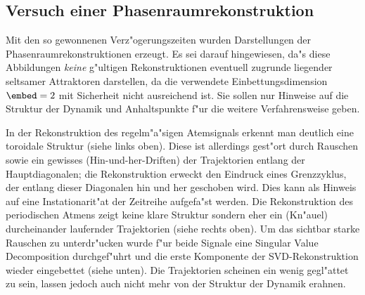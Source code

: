 \subsection{Versuch einer Phasenraumrekonstruktion}
Mit den so gewonnenen Verz"ogerungszeiten wurden Darstellungen der Phasenraumrekonstruktionen
erzeugt. Es sei darauf hingewiesen, da"s diese Abbildungen {\em keine} g"ultigen
Rekonstruktionen eventuell zugrunde liegender seltsamer Attraktoren darstellen, da die
verwendete Einbettungsdimension $\embed=2$ mit Sicherheit nicht ausreichend ist. Sie sollen
nur Hinweise auf die  Struktur der Dynamik und Anhaltspunkte f"ur die weitere
Verfahrensweise geben.

In der Rekonstruktion des regelm"a"sigen Atemsignals erkennt man deutlich eine toroidale
Struktur (siehe  links oben). Diese ist allerdings gest"ort durch Rauschen
sowie ein gewisses \naja(Hin-und-her-Driften) der Trajektorien entlang der
Hauptdiagonalen; die Rekonstruktion erweckt den Eindruck eines Grenzzyklus, der entlang dieser Diagonalen hin
und her geschoben wird. Dies kann als Hinweis auf
eine Instationarit"at der Zeitreihe aufgefa"st werden. Die Rekonstruktion des periodischen Atmens
zeigt keine klare Struktur sondern eher ein \naja(Kn"auel) durcheinander laufernder
Trajektorien (siehe  rechts oben).  Um das sichtbar starke Rauschen zu
unterdr"ucken wurde f"ur beide Signale eine Singular Value Decomposition durchgef"uhrt und
die erste Komponente der SVD-Rekonstruktion wieder eingebettet (siehe 
unten). Die Trajektorien scheinen ein wenig gegl"attet zu sein, lassen jedoch auch nicht
mehr von der Struktur der Dynamik erahnen. 


